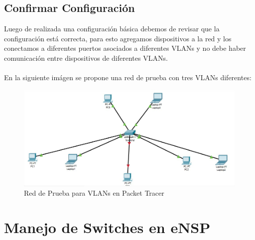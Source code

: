 \documentclass[journal]{IEEEtran}
\begin{document}
\subsection{\textbf{Confirmar Configuración}}
Luego de realizada una configuración básica debemos de revisar que la configuración está correcta, para esto agregamos dispositivos a la red y los conectamos a diferentes puertos asociados a diferentes VLANs y no debe haber comunicación entre dispositivos de diferentes VLANs. \\ \\

En la siguiente imágen se propone una red de prueba con tres VLANs diferentes:

\begin{figure}[ht]
	\centering
	\includegraphics[scale=0.27]{red_prueba.jpg}
	\caption{Red de Prueba para VLANs en Packet Tracer}
\end{figure}

\section{\textbf{Manejo de Switches en eNSP}}
	
\end{document}
